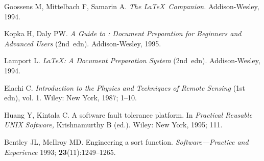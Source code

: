 \documentclass{cpeauth}
\begin{document}
\begin{thebibliography}{99}



Goossens M, Mittelbach F, Samarin A.     %
\textit{The \LaTeX\ Companion.}          %
Addison-Wesley, 1994.                    %

Kopka H, Daly PW.                        %
\textit{A Guide to \LaTeXe:
  Document Preparation for Beginners and Advanced Users}
  (2nd~edn).                             %
Addison-Wesley, 1995.                    %

Lamport L.                               %
\textit{\LaTeX: A Document Preparation System}
  (2nd~edn).                             %
Addison-Wesley, 1994.                    %

Elachi C.                                %
\textit{Introduction to the Physics and Techniques of Remote Sensing}
(1st edn), vol. 1.                        %
Wiley: New York, 1987;                   %
1--10.                                   %

Huang Y, Kintala C.                      %
A software fault tolerance platform.     %
In \textit{Practical Reusable UNIX Software,} %
Krishnamurthy B (ed.).                   %
Wiley: New York, 1995;                   %
111.                                     %

Bentley JL, McIlroy MD.                  %
Engineering a sort function.             %
\textit{Software---Practice and Experience} 1993;  %
\textbf{23}(11):1249--1265.              %


\end{thebibliography}
\end{document}
